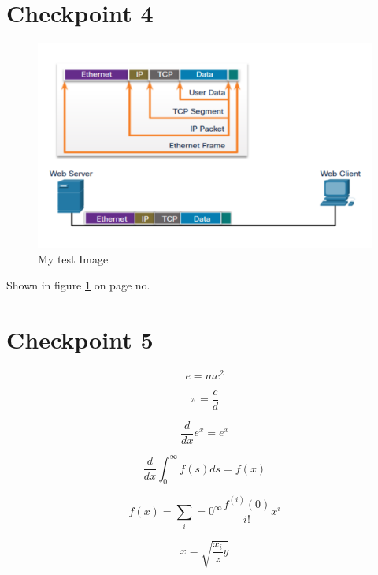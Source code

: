 \documentclass[a4paper,12pt]{article}
\begin{document}
\section{Checkpoint 4}
\begin{figure}[h!]
    \centering
    \includegraphics[width=1\textwidth]{networkingCapture.pdf}
    \caption{My test Image}
    \label{fig:network}
\end{figure}

{\Large Shown in figure \ref{fig:network} on page no. \pageref{fig:network}}

\newpage

\section{Checkpoint 5}
\begin{equation}
    e=mc^2
\end{equation}

\begin{equation}
    \pi=\frac{c}{d}
\end{equation}

\begin{equation}
    \frac{d}{dx}e^x=e^x
\end{equation}

\begin{equation}
    \frac{d}{d x}\int_{0}^{\infty} f(s)ds=f(x)
\end{equation}

\begin{equation}
    f(x)=\sum_{i}=0^{\infty}\frac{f^{(i)}(0)}{i!}x^{i}
\end{equation}

\begin{equation}
    x=\sqrt{\frac{x_i}{z}y}
\end{equation}
\end{document}
